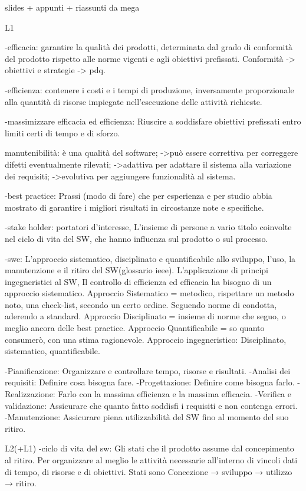 \documentclass{report}
\begin{document}
slides + appunti + riassunti da mega

L1

-efficacia: garantire la qualità dei prodotti, determinata dal grado di conformità del prodotto rispetto alle norme vigenti e agli obiettivi prefissati. Conformità -> obiettivi e strategie -> pdq.

-efficienza: contenere i costi e i tempi di produzione, inversamente proporzionale alla quantità di risorse impiegate nell’esecuzione delle attività richieste.

-massimizzare efficacia ed efficienza: Riuscire a soddisfare obiettivi prefissati entro limiti certi di tempo e di sforzo.

manutenibilità: è una qualità del software; 
->può essere correttiva per correggere difetti eventualmente rilevati; 
->adattiva per adattare il sistema alla variazione dei requisiti; 
->evolutiva per aggiungere funzionalità al sistema.

-best practice: Prassi (modo di fare) che per esperienza e per studio abbia mostrato di garantire i migliori risultati in circostanze note e specifiche.

-stake holder: portatori d'interesse, L’insieme di persone a vario titolo coinvolte nel ciclo di vita del SW, che hanno influenza sul prodotto o sul processo.

-swe: L’approccio sistematico, disciplinato e quantificabile allo sviluppo, l’uso, la manutenzione e il ritiro del SW(glossario ieee).
L’applicazione di principi ingegneristici al SW, Il controllo di efficienza ed efficacia ha bisogno di un approccio sistematico.
Approccio Sistematico = metodico, rispettare un metodo noto, una check-list, secondo un certo ordine. Seguendo norme di condotta, aderendo a standard.
Approccio Disciplinato = insieme di norme che seguo, o meglio ancora delle best practice.
Approccio Quantificabile = so quanto consumerò, con una stima ragionevole.
Approccio ingegneristico: Disciplinato, sistematico, quantificabile.

-Pianificazione: Organizzare e controllare tempo, risorse e risultati.
-Analisi dei requisiti: Definire cosa bisogna fare.
-Progettazione: Definire come bisogna farlo.
-Realizzazione: Farlo con la massima efficienza e la massima efficacia.
-Verifica e validazione: Assicurare che quanto fatto soddisfi i requisiti e non contenga errori.
-Manutenzione: Assicurare piena utilizzabilità del SW fino al momento del suo ritiro.

L2(+L1)
-ciclo di vita del sw: Gli stati che il prodotto assume dal concepimento al ritiro.
Per organizzare al meglio le attività necessarie all’interno di vincoli dati di tempo, di risorse e di obiettivi.
Stati sono Concezione → sviluppo → utilizzo → ritiro.
\end{document}
